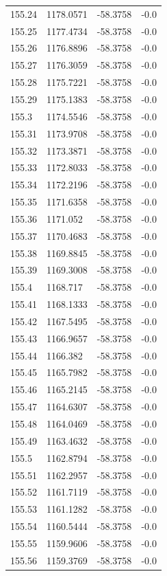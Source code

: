 \begin{table}[H]
\begin{tabular}{llll}
155.24 & 1178.0571 & -58.3758 & -0.0 \\
155.25 & 1177.4734 & -58.3758 & -0.0 \\
155.26 & 1176.8896 & -58.3758 & -0.0 \\
155.27 & 1176.3059 & -58.3758 & -0.0 \\
155.28 & 1175.7221 & -58.3758 & -0.0 \\
155.29 & 1175.1383 & -58.3758 & -0.0 \\
155.3 & 1174.5546 & -58.3758 & -0.0 \\
155.31 & 1173.9708 & -58.3758 & -0.0 \\
155.32 & 1173.3871 & -58.3758 & -0.0 \\
155.33 & 1172.8033 & -58.3758 & -0.0 \\
155.34 & 1172.2196 & -58.3758 & -0.0 \\
155.35 & 1171.6358 & -58.3758 & -0.0 \\
155.36 & 1171.052 & -58.3758 & -0.0 \\
155.37 & 1170.4683 & -58.3758 & -0.0 \\
155.38 & 1169.8845 & -58.3758 & -0.0 \\
155.39 & 1169.3008 & -58.3758 & -0.0 \\
155.4 & 1168.717 & -58.3758 & -0.0 \\
155.41 & 1168.1333 & -58.3758 & -0.0 \\
155.42 & 1167.5495 & -58.3758 & -0.0 \\
155.43 & 1166.9657 & -58.3758 & -0.0 \\
155.44 & 1166.382 & -58.3758 & -0.0 \\
155.45 & 1165.7982 & -58.3758 & -0.0 \\
155.46 & 1165.2145 & -58.3758 & -0.0 \\
155.47 & 1164.6307 & -58.3758 & -0.0 \\
155.48 & 1164.0469 & -58.3758 & -0.0 \\
155.49 & 1163.4632 & -58.3758 & -0.0 \\
155.5 & 1162.8794 & -58.3758 & -0.0 \\
155.51 & 1162.2957 & -58.3758 & -0.0 \\
155.52 & 1161.7119 & -58.3758 & -0.0 \\
155.53 & 1161.1282 & -58.3758 & -0.0 \\
155.54 & 1160.5444 & -58.3758 & -0.0 \\
155.55 & 1159.9606 & -58.3758 & -0.0 \\
155.56 & 1159.3769 & -58.3758 & -0.0 \\

\end{tabular}
\end{table}
